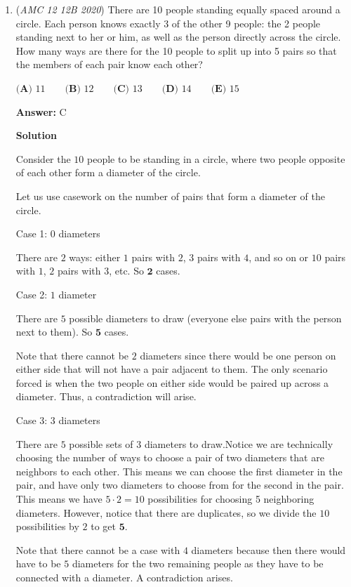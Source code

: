 \begin{enumerate}
 


	\item (\textit{AMC 12 12B 2020}) There are 10 people standing equally spaced around a circle. Each person knows exactly 3 of the other 9 people: the 2 people standing next to her or him, as well as the person directly across the circle. How many ways are there for the 10 people to split up into 5 pairs so that the members of each pair know each other?


 $\textbf{(A) } 11 \qquad \textbf{(B) } 12 \qquad \textbf{(C) } 13 \qquad \textbf{(D) } 14 \qquad \textbf{(E) } 15$

 \textbf{Answer: }C



\textbf{Solution}

Consider the $10$ people to be standing in a circle, where two people opposite of each other form a diameter of the circle.

 Let us use casework on the number of pairs that form a diameter of the circle.

 Case 1: $0$ diameters

 There are $2$ ways: either $1$ pairs with $2$, $3$ pairs with $4$, and so on or $10$ pairs with $1$, $2$ pairs with $3$, etc. So $\boxed{\textbf{2}}$ cases.

 Case 2: $1$ diameter

 There are $5$ possible diameters to draw (everyone else pairs with the person next to them). So $\boxed{\textbf{5}}$ cases.

 Note that there cannot be $2$ diameters since there would be one person on either side that will not have a pair adjacent to them. The only scenario forced is when the two people on either side would be paired up across a diameter. Thus, a contradiction will arise.

 Case 3: $3$ diameters

 There are $5$ possible sets of $3$ diameters to draw.Notice we are technically choosing the number of ways to choose a pair of two diameters that are neighbors to each other. This means we can choose the first diameter in the pair, and have only two diameters to choose from for the second in the pair. This means we have $5 \cdot 2=10$ possibilities for choosing 5 neighboring diameters. However, notice that there are duplicates, so we divide the $10$ possibilities by $2$ to get $\boxed{\textbf{5}}$.

 Note that there cannot be a case with $4$ diameters because then there would have to be $5$ diameters for the two remaining people as they have to be connected with a diameter. A contradiction arises.


\end{enumerate}
